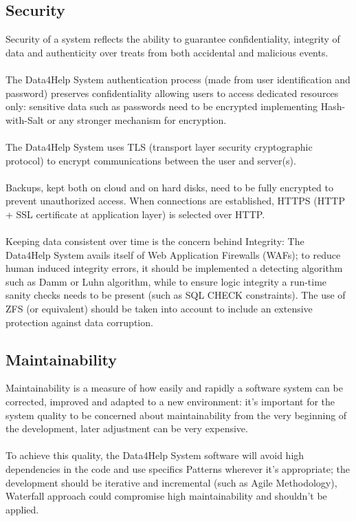 \subsection{Security}
Security of a system reflects the ability to guarantee confidentiality, integrity of data and authenticity over treats from both accidental and malicious events.
\\
\\ 
The Data4Help System authentication process (made from user identification and password) preserves confidentiality allowing users to access dedicated resources only: sensitive data such as passwords need to be encrypted implementing Hash-with-Salt or any stronger mechanism for encryption. 
\\
\\
The Data4Help System uses TLS (transport layer security cryptographic protocol) to encrypt communications between the user and server(s).
\\
\\
Backups, kept both on cloud and on hard disks, need to be fully encrypted to prevent unauthorized access. When connections are established, HTTPS (HTTP + SSL certificate at application layer) is selected over HTTP.
\\
\\
Keeping data consistent over time is the concern behind Integrity: The Data4Help System avails itself of Web Application Firewalls (WAFs); to reduce human induced integrity errors, it should be implemented a detecting algorithm such as Damm or Luhn algorithm, while to ensure logic integrity a run-time sanity checks needs to be present (such as SQL CHECK constraints). The use of ZFS (or equivalent) should be taken into account to include an extensive protection against data corruption. 
\subsection{Maintainability}
Maintainability is a measure of how easily and rapidly a software system can be corrected, improved and adapted to a new environment: it’s important for the system quality to be concerned about maintainability from the very beginning of the development, later adjustment can be very expensive.
\\
\\
To achieve this quality, the Data4Help System software will avoid high dependencies in the code and use specifics Patterns wherever it’s appropriate; the development should be iterative and incremental (such as Agile Methodology), Waterfall approach could compromise high maintainability and shouldn’t be applied. 
